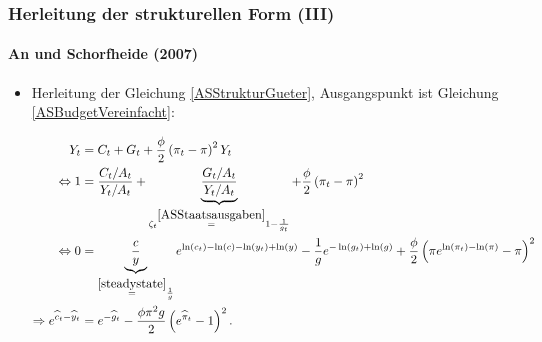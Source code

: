 \documentclass[10pt]{beamer}  %
\begin{document}
\begin{frame}
\frametitle{Herleitung der strukturellen Form (III)}\framesubtitle{An und Schorfheide (2007)}
\begin{itemize}
\item Herleitung der Gleichung \eqref{ASStrukturGueter}, Ausgangspunkt ist Gleichung \eqref{ASBudgetVereinfacht}:
\begin{scriptsize}
\begin{align*}
    Y_t &= C_t + G_t + \frac{\phi}{2} \left(\pi_t -\pi \right)^2 Y_t\\
\Leftrightarrow  1 &= \frac{C_t/A_t}{Y_t/A_t} + \underbrace{\frac{G_t/A_t}{Y_t/A_t}}_{\zeta_t \overset{\eqref{ASStaatsausgaben}}{=}1-\frac{1}{g_t}} + \frac{\phi}{2}\left(\pi_t - \pi\right)^2\\
\Leftrightarrow  0 &= \underbrace{\frac{c}{y}}_{\overset{\eqref{steadystate}}{=}\frac{1}{g}} e^{\ln(c_t)-\ln(c)-\ln(y_t)+\ln(y)} -\frac{1}{g}e^{-\ln(g_t)+\ln(g)} + \frac{\phi}{2}\left(\pi e^{\ln(\pi_t)-\ln(\pi)}-\pi\right)^2\\
\Rightarrow  e^{\widehat{c}_t-\widehat{y}_t}& = e^{-\widehat{g}_t} -\frac{\phi \pi^2 g}{2} \left(e^{\widehat{\pi}_t}-1\right)^2.
\end{align*}
\end{scriptsize}
\end{itemize}
\hyperlink{Struktur}{}
\end{frame}
\end{document}
